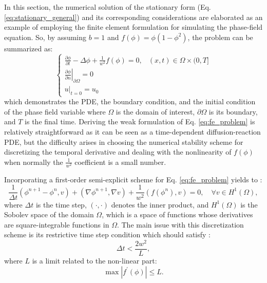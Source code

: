 In this section, the numerical solution of the stationary form (Eq. \ref{eq:stationary_general}) and its corresponding considerations are elaborated as an example of employing the finite element formulation for simulating the phase-field equation. So, by assuming $b=1$ and $f(\phi)=\phi\left(1-\phi^{2}\right)$, the problem can be summarized as:
\begin{equation} \label{eq:fe_problem}
\left\{\begin{array}{ll}
\frac{\partial \phi}{\partial t}-\Delta \phi+\frac{1}{w^{2}} f(\phi)=0, & (x, t) \in \Omega \times(0, T] \\
\left.\frac{\partial \phi}{\partial n} \right|_{\partial \Omega}=0 \\
\left.u\right|_{t=0}=u_{0}
\end{array}\right.
\end{equation}
which demonstrates the PDE, the boundary condition, and the initial condition of the phase field variable where $\Omega$ is the domain of interest, $\partial \Omega$ is its boundary, and $T$ is the final time. Deriving the weak formulation of Eq. \ref{eq:fe_problem} is relatively straightforward as it can be seen as a time-dependent diffusion-reaction PDE, but the difficulty arises in choosing the numerical stability scheme for discretizing the temporal derivative and dealing with the nonlinearity of $f(\phi)$ when normally the $\frac{1}{w^{2}}$ coefficient is a small number.

Incorporating a first-order semi-explicit scheme for Eq. \ref{eq:fe_problem} yields to \cite{Abboud2019}:
\begin{equation} \label{eq:semi-implicit}
\frac{1}{\Delta t}\left(\phi^{n+1}-\phi^{n}, v\right)+\left(\nabla \phi^{n+1}, \nabla v\right)+\frac{1}{w^{2}}\left(f\left(\phi^{n}\right), v\right)=0, \quad \forall v \in H^{1}(\Omega),
\end{equation}
where $\Delta t$ is the time step, $(\cdot,\cdot)$ denotes the inner product, and $H^{1}(\Omega)$ is the Sobolev space of the domain $\Omega$, which is a space of functions whose derivatives are square-integrable functions in $\Omega$. The main issue with this discretization scheme is its restrictive time step condition which should satisfy \cite{Shen2010}:
\begin{equation}
\Delta t < \frac{2w^2}{L},
\end{equation}
where $L$ is a limit related to the non-linear part:
\begin{equation}
\max \left|f^{\prime}(\phi)\right| \leq L.
\end{equation}

